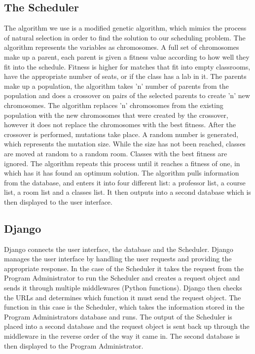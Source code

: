 \documentclass[12pt]{article}
\begin{document}
\subsection{The Scheduler}
The algorithm we use is a modified genetic algorithm, which mimics the process of natural selection in order to find the solution to our scheduling problem. The algorithm represents the variables as chromosomes. A full set of chromosomes make up a parent, each parent is given a fitness value according to how well they fit into the schedule. Fitness is higher for matches that fit into empty classrooms, have the appropriate number of seats, or if the class has a lab in it. The parents make up a population, the algorithm takes 'n' number of parents from the population and does a crossover on pairs of the selected parents to create 'n' new chromosomes. The algorithm replaces 'n' chromosomes from the existing population with the new chromosomes that were created by the crossover, however it does not replace the chromosomes with the best fitness. After the crossover is performed, mutations take place. A random number is generated, which represents the mutation size. While the size has not been reached, classes are moved at random to a random room. Classes with the best fitness are ignored. The algorithm repeats this process until it reaches a fitness of one, in which has it has found an optimum solution. The algorithm pulls information from the database, and enters it into four different list: a professor list, a course list, a room list and a classes list. It then outputs into a second database which is then displayed to the user interface.

\subsection{Django}
Django connects the user interface, the database and the Scheduler. Django manages the user interface by handling the user requests and providing the appropriate response. In the case of the Scheduler it takes the request from the Program Administrator to run the Scheduler and creates a request object and sends it through multiple middlewares (Python functions). Django then checks the URLs and determines which function it must send the request object. The function in this case is the Scheduler, which takes the information stored in the Program Administrators database and runs. The output of the Scheduler is placed into a second database and the request object is sent back up through the middleware in the reverse order of the way it came in. The second database is then displayed to the Program Administrator.
\end{document}
